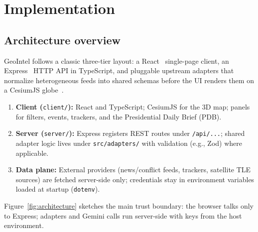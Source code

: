 \section{Implementation}

\subsection{Architecture overview}

GeoIntel follows a classic three-tier layout: a React~\cite{react} single-page client, an Express~\cite{express} HTTP API in TypeScript, and pluggable upstream adapters that normalize heterogeneous feeds into shared schemas before the UI renders them on a CesiumJS globe~\cite{cesium}.

\begin{enumerate}[leftmargin=*]
  \item \textbf{Client (}\texttt{client/}\textbf{):} React and TypeScript; CesiumJS for the 3D map; panels for filters, events, trackers, and the Presidential Daily Brief (PDB).
  \item \textbf{Server (}\texttt{server/}\textbf{):} Express registers REST routes under \texttt{/api/...}; shared adapter logic lives under \texttt{src/adapters/} with validation (e.g., Zod) where applicable.
  \item \textbf{Data plane:} External providers (news/conflict feeds, trackers, satellite TLE sources) are fetched server-side only; credentials stay in environment variables loaded at startup (\texttt{dotenv}).
\end{enumerate}

Figure~\ref{fig:architecture} sketches the main trust boundary: the browser talks only to Express; adapters and Gemini calls run server-side with keys from the host environment.


